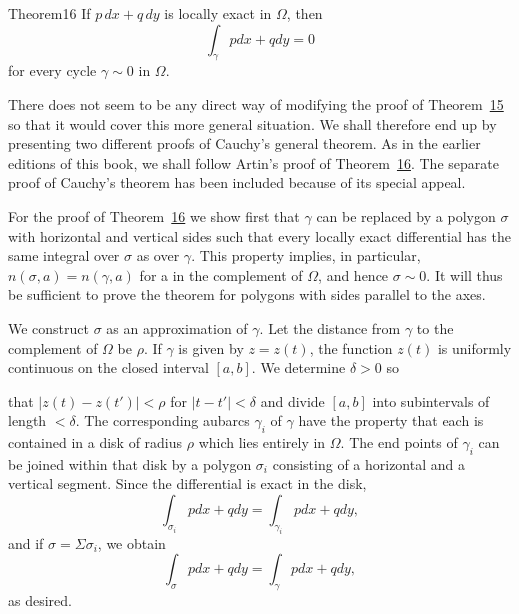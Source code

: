 \begin{originalstatement}{Theorem}{16}\label{thm:4.16}
If $p \, dx + q \, dy$ is locally exact in $\Omega$, then
\begin{equation*}
\int_ {\gamma} p d x + q d y = 0
\end{equation*}
for every cycle $\gamma \sim 0$ in $\Omega$.

\end{originalstatement}
There does not seem to be any direct way of modifying the proof of Theorem~\hyperref[thm:4.15]{15} so that it would cover this more general situation. We shall therefore end up by presenting two different proofs of Cauchy's general theorem. As in the earlier editions of this book, we shall follow Artin's proof of Theorem~\hyperref[thm:4.16]{16}. The separate proof of Cauchy's theorem has been included because of its special appeal.

For the proof of Theorem~\hyperref[thm:4.16]{16} we show first that $\gamma$ can be replaced by a polygon $\sigma$ with horizontal and vertical sides such that every locally exact differential has the same integral over $\sigma$ as over $\gamma$. This property implies, in particular, $n(\sigma,a) = n(\gamma,a)$ for a in the complement of $\Omega$, and hence $\sigma \sim 0$. It will thus be sufficient to prove the theorem for polygons with sides parallel to the axes.

We construct $\sigma$ as an approximation of $\gamma$. Let the distance from $\gamma$ to the complement of $\Omega$ be $\rho$. If $\gamma$ is given by $z = z(t)$, the function $z(t)$ is uniformly continuous on the closed interval $[a,b]$. We determine $\delta > 0$ so


that $|z(t) - z(t')| < \rho$ for $|t - t'| < \delta$ and divide $[a, b]$ into subintervals of length $< \delta$. The corresponding aubarcs $\gamma_i$ of $\gamma$ have the property that each is contained in a disk of radius $\rho$ which lies entirely in $\Omega$. The end points of $\gamma_i$ can be joined within that disk by a polygon $\sigma_i$ consisting of a horizontal and a vertical segment. Since the differential is exact in the disk,
\begin{equation*}
\int_ {\sigma_ {i}} p d x + q d y = \int_ {\gamma_ {i}} p d x + q d y,
\end{equation*}
and if $\sigma = \Sigma \sigma_{i}$, we obtain
\begin{equation*}
\int_ {\sigma} p d x + q d y = \int_ {\gamma} p d x + q d y,
\end{equation*}
as desired.

